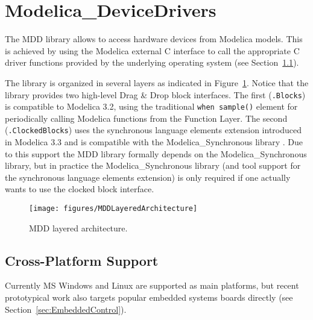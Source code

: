 \documentclass{resources/modelica}
\newcommand{\modelica}[1]{\lstinline[language=modelica]|#1|}
\newcommand{\BTHI}[1]{{\color{blue}{$\parallel_\textrm{BTHI}$#1$\parallel$}}}
\begin{document}


\section{Modelica\_DeviceDrivers}
\label{ModelicaDeviceDrivers}
\BTHI{TODO: Bernhard, Thomas, Volker}

The MDD library allows to access hardware devices from Modelica models.
This is achieved by using the Modelica external C interface to call the
appropriate C driver functions provided by the underlying operating system (see
Section~\ref{sec:CrossPlatformSupport}).

The library is organized in several layers as indicated in
Figure~\ref{fig:MDDLayeredArchitecture}. Notice that the library
provides two high-level Drag \& Drop block interfaces. The first (\texttt{.Blocks}) is
compatible to Modelica 3.2, using the traditional \modelica{when sample()}
element for periodically calling Modelica functions from the \textsf{Function Layer}. The second
(\texttt{.ClockedBlocks}) uses the synchronous language elements extension
introduced in Modelica 3.3 and is compatible with the
Modelica\_Synchronous library \citep{Otter2012}. Due to this support the MDD
library formally depends on the Modelica\_Synchronous library, but in
practice the Modelica\_Synchronous library (and tool support for the
synchronous language elements extension) is only required if one actually wants
to use the clocked block interface.
\begin{figure}[htb]
\begin{center}
  \texttt{[image: figures/MDDLayeredArchitecture]}
  \caption{MDD layered architecture.}
  \label{fig:MDDLayeredArchitecture}
\end{center}
\end{figure}

\subsection{Cross-Platform Support}
\label{sec:CrossPlatformSupport}

Currently MS Windows and Linux are supported as main platforms, but recent
prototypical work also targets popular embedded systems boards directly (see
Section~\ref{sec:EmbeddedControl}).
\end{document}
